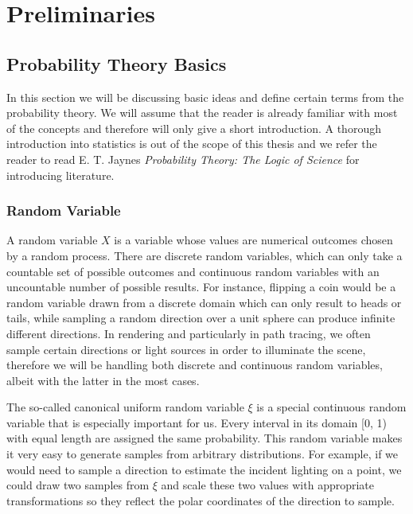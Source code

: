 
\chapter{Preliminaries}
\label{ch:preliminaries}

\section{Probability Theory Basics}
\label{ch:preliminaries:ptb}

In this section we will be discussing basic ideas and define certain terms from the probability theory. We will assume that the reader is already familiar with most of the concepts and therefore will only give a short introduction. A thorough introduction into statistics is out of the scope of this thesis and we refer the reader to read  E. T. Jaynes \textit{Probability Theory: The Logic of Science} for introducing literature. \cite{PTTLS}

\subsection{Random Variable}

A random variable $X$ is a variable whose values are numerical outcomes chosen by a random process. There are discrete random variables, which can only take a countable set of possible outcomes and continuous random variables with an uncountable number of possible results. For instance, flipping a coin would be a random variable drawn from a discrete domain which can only result to heads or tails, while sampling a random direction over a unit sphere can produce infinite different directions. In rendering and particularly in path tracing, we often sample certain directions or light sources in order to illuminate the scene, therefore we will be handling both discrete and continuous random variables, albeit with the latter in the most cases.

The so-called canonical uniform random variable $\xi$ is a special continuous random variable that is especially important for us. Every interval in its domain [0, 1) with equal length are assigned the same probability. This random variable makes it very easy to generate samples from arbitrary distributions. For example, if we would need to sample a direction to estimate the incident lighting on a point, we could draw two samples from $\xi$ and scale these two values with appropriate transformations so they reflect the polar coordinates of the direction to sample.

